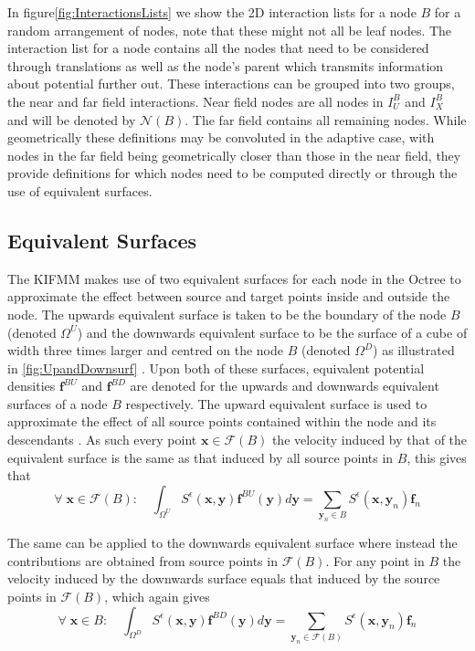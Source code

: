 In figure\ref{fig:InteractionsLists} we show the 2D interaction lists for a node $B$ for a random arrangement of nodes, note that these might not all be leaf nodes. The interaction list for a node contains all the nodes that need to be considered through translations as well as the node's parent which transmits information about potential further out. These interactions can be grouped into two groups, the near and far field interactions. Near field nodes are all nodes in $I_U^B$ and $I_X^B$ and will be denoted by $\mathcal{N}(B)$. The far field contains all remaining nodes. While geometrically these definitions may be convoluted in the adaptive case, with nodes in the far field being geometrically closer than those in the near field, they provide definitions for which nodes need to be computed directly or through the use of equivalent surfaces.

\subsection{Equivalent Surfaces}

The KIFMM makes use of two equivalent surfaces for each node in the Octree to approximate the effect between source and target points inside and outside the node. The upwards equivalent surface is taken to be the boundary of the node $B$ (denoted $\Omega^U$) and the downwards equivalent surface to be the surface of a cube of width three times larger and centred on the node $B$ (denoted $\Omega^D$) as illustrated in \cref{fig:UpandDownsurf} \cite{Ying2004}. Upon both of these surfaces, equivalent potential densities $\bm{f}^{BU}$ and $\bm{f}^{BD}$ are denoted for the upwards and downwards equivalent surfaces of a node $B$ respectively. The upward equivalent surface is used to approximate the effect of all source points contained within the node and its descendants \cite{Rostami2016Kernel-independentStokeslets,Yan}. As such every point $\bm{x}\in\mathcal{F}(B)$ the velocity induced by that of the equivalent surface is the same as that induced by all source points in $B$, this gives that
\begin{equation}
\label{eq:upsurfint}
    \forall \;\bm{x} \in \mathcal{F}(B): \quad \int_{\Omega^U} S^\epsilon(\bm{x}, \bm{y}) \bm{f}^{BU}(\bm{y}) d \bm{y}=\sum_{{\bm{y}}_n \in B} S^\epsilon\left(\bm{x}, {\bm{y}}_n\right) {\bm{f}}_{n}
\end{equation}

The same can be applied to the downwards equivalent surface where instead the contributions are obtained from source points in $\mathcal{F}(B)$. For any point in $B$ the velocity induced by the downwards surface equals that induced by the source points in $\mathcal{F}(B)$, which again gives
\begin{equation}
\label{eq:downsurfint}
    \forall \;\bm{x} \in B: \quad \int_{\Omega^D} S^\epsilon(\bm{x}, \bm{y}) \bm{f}^{BD}(\bm{y}) d \bm{y}=\sum_{{\bm{y}}_n \in \mathcal{F}(B)} S^\epsilon\left(\bm{x}, {\bm{y}}_n\right) {\bm{f}}_{n}
\end{equation}

